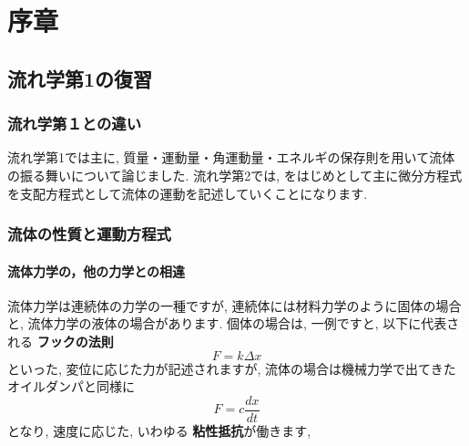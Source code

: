 \documentclass[uplatex,12pt]{jsbook}
\newcommand{\strong}[1]{{\textbf{\color{violet} #1}}}
\begin{document}
	\chapter{序章}
	\section{流れ学第1の復習}
	\subsection{流れ学第１との違い}
	流れ学第1では主に, 質量・運動量・角運動量・エネルギの保存則を用いて流体の振る舞いについて論じました. 流れ学第2では, \NS{}をはじめとして主に微分方程式を支配方程式として流体の運動を記述していくことになります.
	
	\subsection{流体の性質と運動方程式}
	\subsubsection{流体力学の，他の力学との相違}
	流体力学は連続体の力学の一種ですが, 連続体には材料力学のように固体の場合と, 流体力学の液体の場合があります. 個体の場合は, 一例ですと, 以下に代表される\strong{フックの法則}
	\begin{equation}
		F = k\Delta x
	\end{equation}
	といった, 変位に応じた力が記述されますが, 流体の場合は機械力学で出てきたオイルダンパと同様に
	\begin{equation}
		F = c \frac{dx}{dt}
	\end{equation}
	となり, 速度に応じた, いわゆる\strong{粘性抵抗}が働きます, 
	
\end{document}
